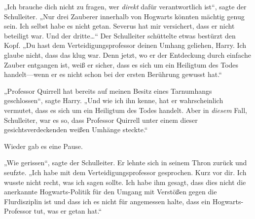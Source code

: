 „Ich brauche dich nicht zu fragen, wer \emph{direkt} dafür verantwortlich ist“, sagte der Schulleiter.
„Nur drei Zauberer innerhalb von Hogwarts könnten mächtig genug sein. Ich selbst habe es nicht getan. Severus hat mir versichert, dass er nicht beteiligt war. Und der dritte…“ Der Schulleiter schüttelte etwas bestürzt den Kopf.
„Du hast dem Verteidigungsprofessor deinen Umhang geliehen, Harry. Ich glaube nicht, dass das klug war. Denn jetzt, wo er der Entdeckung durch einfache Zauber entgangen ist, weiß er sicher, dass es sich um ein Heiligtum des Todes handelt—wenn er es nicht schon bei der ersten Berührung gewusst hat.“

„Professor Quirrell hat bereits auf meinen Besitz eines Tarnumhangs geschlossen“, sagte Harry.
„Und wie ich ihn kenne, hat er wahrscheinlich vermutet, dass es sich um ein Heiligtum des Todes handelt. Aber in \emph{diesem} Fall, Schulleiter, war es so, dass Professor Quirrell unter einem dieser gesichtsverdeckenden weißen Umhänge steckte.“

Wieder gab es eine Pause.

„Wie gerissen“, sagte der Schulleiter. Er lehnte sich in seinem Thron zurück und seufzte.
„Ich habe mit dem Verteidigungsprofessor gesprochen. Kurz vor dir. Ich wusste nicht recht, was ich sagen sollte. Ich habe ihm gesagt, dass dies nicht die anerkannte Hogwarts-Politik für den Umgang mit Verstößen gegen die Flurdisziplin ist und dass ich es nicht für angemessen halte, dass ein Hogwarts-Professor tut, was er getan hat.“

